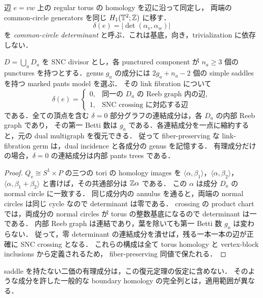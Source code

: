 \begin{definition}\label{trop:delta-definition}
辺 $e=vw$ 上の regular torus の homology を辺に沿って同定し，
両端の common-circle generators を同じ $H_1(\mathbb T^2;\mathbb Z)$ に移す．
\[
 \delta(e)=|\det(\alpha_v,\alpha_w)|
\]
を \emph{common-circle determinant} と呼ぶ．これは基底，向き，trivialization に依存しない．
\end{definition}

\begin{proposition}
\label{trop:divisor-recovery}
$D=\bigcup_aD_a$ を SNC divisor とし，各 punctured component が
$n_a\geq3$ 個の punctures を持つとする．genus $g_a$ の成分には
$2g_a+n_a-2$ 個の simple saddles を持つ marked pants model を選ぶ．
その link fibration について
\[
 \delta(e)=
 \begin{cases}
 0,&\text{同一の }D_a\text{ の Reeb graph 内の辺},\\
 1,&\text{SNC crossing に対応する辺}
 \end{cases}
\]
である．全ての頂点を含む $\delta=0$ 部分グラフの連結成分は，各 $D_a$ の内部 Reeb graph であり，
その第一 Betti 数は $g_a$ である．各連結成分を一点に縮約すると，元の dual multigraph を復元できる．
従って fiber-preserving な link-fibration germ は，dual incidence と各成分の genus を記憶する．
有理成分だけの場合，$\delta=0$ の連結成分は内部 pants trees である．
\end{proposition}

\begin{proof}
$Q_v\cong S^1\times P$ の三つの tori の homology images を
$\langle\alpha,\beta_1\rangle$，$\langle\alpha,\beta_2\rangle$，
$\langle\alpha,\beta_1+\beta_2\rangle$ と書けば，その共通部分は $\mathbb Z\alpha$ である．
この $\alpha$ は成分 $D_a$ の normal circle に一致する．
同じ成分内の annulus を通ると，両端の normal circles は同じ cycle なので determinant は零である．
crossing の product chart では，両成分の normal circles が torus の整数基底になるので determinant は一である．
内部 Reeb graph は連結であり，葉を除いても第一 Betti 数 $g_a$ は変わらない．
従って，零 determinant の連結成分を潰せば，残る一本一本の辺が正確に SNC crossing となる．
これらの構成は全て torus homology と vertex-block inclusions から定義されるため，
fiber-preserving 同値で保たれる．
\end{proof}

\begin{remark}
saddle を持たない二価の有理成分は，この復元定理の仮定に含めない．
そのような成分を許した一般的な boundary homology の完全列とは，適用範囲が異なる．
\end{remark}

